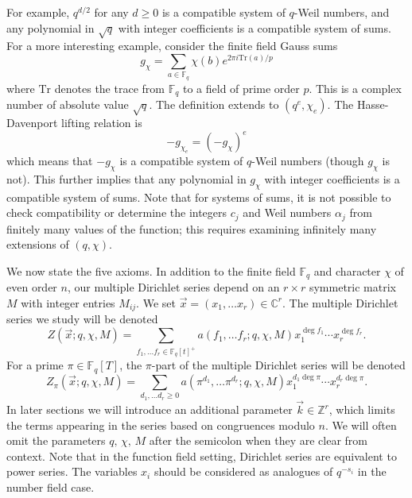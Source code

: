 \documentclass[11pt,letterpaper]{article}
\theoremstyle{definition}
\theoremstyle{remark}
\numberwithin{equation}{section}
\theoremstyle{dotless}
\newcommand{\C}{\mathbb{C}}
\newcommand{\Z}{\mathbb{Z}}
\newcommand{\F}{\mathbb{F}}
\newcommand{\Tr}{{\mathrm{Tr}}}
\begin{document}
For example, $q^{d/2}$ for any $d \geq 0$ is a compatible system of $q$-Weil numbers, and any polynomial in $\sqrt{q}$ with integer coefficients is a compatible system of sums. For a more interesting example, consider the finite field Gauss sums
\begin{equation*}
g_\chi = \sum_{a \in \F_q} \chi(b) e^{2 \pi i \Tr(a)/p}
\end{equation*}
where $\Tr$ denotes the trace from $\F_q$ to a field of prime order $p$. This is a complex number of absolute value $\sqrt{q}$. The definition extends to $(q^e, \chi_e)$. The Hasse-Davenport lifting relation is 
\begin{equation*}
-g_{\chi_e} = (-g_{\chi})^e
\end{equation*}
which means that $-g_\chi$ is a compatible system of $q$-Weil numbers (though $g_\chi$ is not). This further implies that any polynomial in $g_\chi$ with integer coefficients is a compatible system of sums. Note that for systems of sums, it is not possible to check compatibility or determine the integers $c_j$ and Weil numbers $\alpha_j$ from finitely many values of the function; this requires examining infinitely many extensions of $(q, \chi)$.

We now state the five axioms. In addition to the finite field $\F_q$ and character $\chi$ of even order $n$, our multiple Dirichlet series depend on an $r \times r$ symmetric matrix $M$ with integer entries $M_{ij}$. We set $\vec{x}=(x_1, \ldots x_r) \in \C^r$. The multiple Dirichlet series we study will be denoted 
\begin{equation}
Z(\vec{x}; q, \chi, M) = \sum_{f_1, \ldots f_r \in \F_q[t]^+} a(f_1, \ldots f_r; q, \chi, M) x_1^{\deg f_1}\cdots x_r^{\deg f_r}.
\end{equation}
For a prime $\pi \in \F_q[T]$, the $\pi$-part of the multiple Dirichlet series will be denoted
\begin{equation}
Z_\pi(\vec{x}; q, \chi, M) = \sum_{d_1, \ldots d_r \geq 0} a(\pi^{d_1}, \ldots \pi^{d_r}; q, \chi, M) x_1^{d_1 \deg \pi}\cdots x_r^{d_r \deg \pi}.
\end{equation}
In later sections we will introduce an additional parameter $\vec{k} \in \Z^r$, which limits the terms appearing in the series based on congruences modulo $n$. We will often omit the parameters $q, \, \chi, \, M$ after the semicolon when they are clear from context. Note that in the function field setting, Dirichlet series are equivalent to power series. The variables $x_i$ should be considered as analogues of $q^{-s_i}$ in the number field case. 
\end{document}

